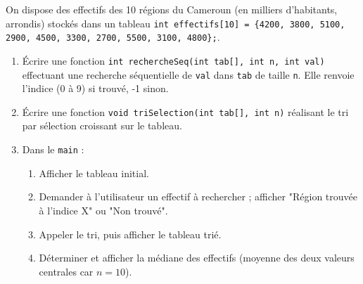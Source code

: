 \documentclass[11pt]{article}
\begin{document}
\begin{exercice}
On dispose des effectifs des 10 régions du Cameroun (en milliers d'habitants, arrondis) stockés dans un tableau \texttt{int effectifs[10] = \{4200, 3800, 5100, 2900, 4500, 3300, 2700, 5500, 3100, 4800\};}.

\begin{enumerate}
    \item Écrire une fonction \texttt{int rechercheSeq(int tab[], int n, int val)} effectuant une recherche séquentielle de \texttt{val} dans \texttt{tab} de taille \texttt{n}. Elle renvoie l'indice (0 à 9) si trouvé, -1 sinon.
    \item Écrire une fonction \texttt{void triSelection(int tab[], int n)} réalisant le tri par sélection croissant sur le tableau.
    \item Dans le \texttt{main} :
    \begin{enumerate}
        \item Afficher le tableau initial.
        \item Demander à l'utilisateur un effectif à rechercher ; afficher "Région trouvée à l'indice X" ou "Non trouvé".
        \item Appeler le tri, puis afficher le tableau trié.
        \item Déterminer et afficher la médiane des effectifs (moyenne des deux valeurs centrales car $n=10$).
    \end{enumerate}
\end{enumerate}
\end{exercice}
\end{document}
